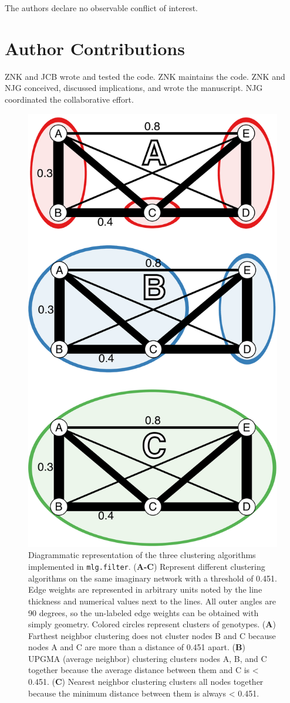 \documentclass[double,12pt]{beavtex}
\begin{document}
  The authors declare no observable conflict of interest.
  
  \section{Author Contributions}\label{author-contributions}
  
  ZNK and JCB wrote and tested the code. ZNK maintains the code. ZNK and
  NJG conceived, discussed implications, and wrote the manuscript. NJG
  coordinated the collaborative effort.
  
  \begin{figure}
  
  {\centering \includegraphics[width=0.5\linewidth]{figure/frontiers/Figure-1} 
  
  }
  
  \caption[Diagrammatic representation of the three clustering algorithms
  implemented in \texttt{mlg.filter}.]{Diagrammatic representation of the three clustering algorithms
  implemented in \texttt{mlg.filter}. (\textbf{A-C}) Represent different
  clustering algorithms on the same imaginary network with a threshold of
  0.451. Edge weights are represented in arbitrary units noted by the line
  thickness and numerical values next to the lines. All outer angles are
  90 degrees, so the un-labeled edge weights can be obtained with simply
  geometry. Colored circles represent clusters of genotypes. (\textbf{A})
  Farthest neighbor clustering does not cluster nodes B and C because
  nodes A and C are more than a distance of 0.451 apart. (\textbf{B})
  UPGMA (average neighbor) clustering clusters nodes A, B, and C together
  because the average distance between them and C is \textless{} 0.451.
  (\textbf{C}) Nearest neighbor clustering clusters all nodes together
  because the minimum distance between them is always \textless{} 0.451.}\label{fig:Figure1}
  \end{figure}
  
\end{document}
